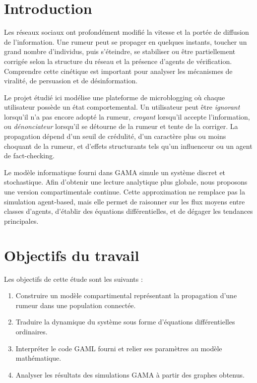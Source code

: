 \documentclass[11pt,a4paper]{article}
\begin{document}
\section{Introduction}

Les réseaux sociaux ont profondément modifié la vitesse et la portée de diffusion de l'information. Une rumeur peut se propager en quelques instants, toucher un grand nombre d'individus, puis s'éteindre, se stabiliser ou être partiellement corrigée selon la structure du réseau et la présence d'agents de vérification. Comprendre cette cinétique est important pour analyser les mécanismes de viralité, de persuasion et de désinformation.

Le projet étudié ici modélise une plateforme de microblogging où chaque utilisateur possède un état comportemental. Un utilisateur peut être \emph{ignorant} lorsqu'il n'a pas encore adopté la rumeur, \emph{croyant} lorsqu'il accepte l'information, ou \emph{dénonciateur} lorsqu'il se détourne de la rumeur et tente de la corriger. La propagation dépend d'un seuil de crédulité, d'un caractère plus ou moins choquant de la rumeur, et d'effets structurants tels qu'un influenceur ou un agent de fact-checking.

Le modèle informatique fourni dans GAMA simule un système discret et stochastique. Afin d'obtenir une lecture analytique plus globale, nous proposons une version compartimentale continue. Cette approximation ne remplace pas la simulation agent-based, mais elle permet de raisonner sur les flux moyens entre classes d'agents, d'établir des équations différentielles, et de dégager les tendances principales.

\section{Objectifs du travail}

Les objectifs de cette étude sont les suivants :

\begin{enumerate}[label=\arabic*.]
  \item Construire un modèle compartimental représentant la propagation d'une rumeur dans une population connectée.
  \item Traduire la dynamique du système sous forme d'équations différentielles ordinaires.
  \item Interpréter le code GAML fourni et relier ses paramètres au modèle mathématique.
  \item Analyser les résultats des simulations GAMA à partir des graphes obtenus.
\end{enumerate}
\end{document}
